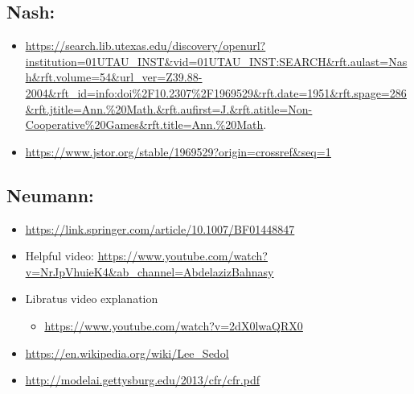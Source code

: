 \documentclass[
]{article}
\begin{document}
\subsection{Nash:}\label{nash}

\begin{itemize}
\item
  \href{https://search.lib.utexas.edu/discovery/openurl?institution=01UTAU_INST&vid=01UTAU_INST:SEARCH&rft.aulast=Nash&rft.volume=54&url_ver=Z39.88-2004&rft_id=info:doi\%2F10.2307\%2F1969529&rft.date=1951&rft.spage=286&rft.jtitle=Ann.\%20Math.&rft.aufirst=J.&rft.atitle=Non-Cooperative\%20Games&rft.title=Ann.\%20Math}{\ul{https://search.lib.utexas.edu/discovery/openurl?institution=01UTAU\_INST\&vid=01UTAU\_INST:SEARCH\&rft.aulast=Nash\&rft.volume=54\&url\_ver=Z39.88-2004\&rft\_id=info:doi\%2F10.2307\%2F1969529\&rft.date=1951\&rft.spage=286\&rft.jtitle=Ann.\%20Math.\&rft.aufirst=J.\&rft.atitle=Non-Cooperative\%20Games\&rft.title=Ann.\%20Math}}.
\item
  \href{https://www.jstor.org/stable/1969529?origin=crossref&seq=1}{\ul{https://www.jstor.org/stable/1969529?origin=crossref\&seq=1}}
\end{itemize}

\subsection{Neumann:}\label{neumann}

\begin{itemize}
\item
  \href{https://link.springer.com/article/10.1007/BF01448847}{\ul{https://link.springer.com/article/10.1007/BF01448847}}
\item
  Helpful video:
  \href{https://www.youtube.com/watch?v=NrJpVhuieK4&ab_channel=AbdelazizBahnasy}{\ul{https://www.youtube.com/watch?v=NrJpVhuieK4\&ab\_channel=AbdelazizBahnasy}}
\end{itemize}

\begin{itemize}
\item
  Libratus video explanation

  \begin{itemize}
  \item
    \href{https://www.youtube.com/watch?v=2dX0lwaQRX0}{\ul{https://www.youtube.com/watch?v=2dX0lwaQRX0}}
  \end{itemize}
\item
  \href{https://en.wikipedia.org/wiki/Lee_Sedol}{\ul{https://en.wikipedia.org/wiki/Lee\_Sedol}}
\item
  \href{http://modelai.gettysburg.edu/2013/cfr/cfr.pdf}{\ul{http://modelai.gettysburg.edu/2013/cfr/cfr.pdf}}
\end{itemize}
\end{document}
